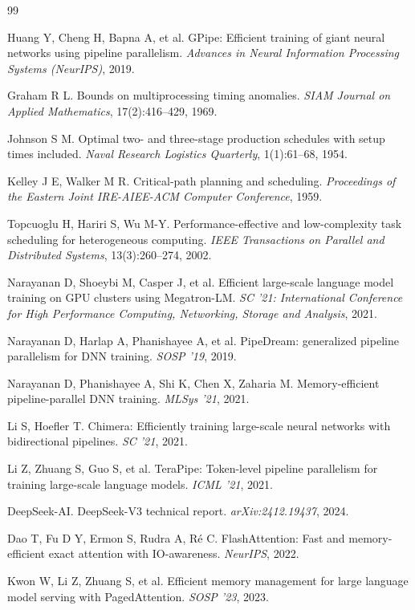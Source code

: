 \documentclass[11pt]{article}
\begin{document}
\begin{thebibliography}{99}

 Huang Y, Cheng H, Bapna A, et al. GPipe: Efficient training of giant neural networks using pipeline parallelism. \emph{Advances in Neural Information Processing Systems (NeurIPS)}, 2019.

 Graham R L. Bounds on multiprocessing timing anomalies. \emph{SIAM Journal on Applied Mathematics}, 17(2):416--429, 1969.

 Johnson S M. Optimal two- and three-stage production schedules with setup times included. \emph{Naval Research Logistics Quarterly}, 1(1):61--68, 1954.

 Kelley J E, Walker M R. Critical-path planning and scheduling. \emph{Proceedings of the Eastern Joint IRE-AIEE-ACM Computer Conference}, 1959.

 Topcuoglu H, Hariri S, Wu M-Y. Performance-effective and low-complexity task scheduling for heterogeneous computing. \emph{IEEE Transactions on Parallel and Distributed Systems}, 13(3):260--274, 2002.

 Narayanan D, Shoeybi M, Casper J, et al. Efficient large-scale language model training on GPU clusters using Megatron-LM. \emph{SC '21: International Conference for High Performance Computing, Networking, Storage and Analysis}, 2021.

 Narayanan D, Harlap A, Phanishayee A, et al. PipeDream: generalized pipeline parallelism for DNN training. \emph{SOSP '19}, 2019.

 Narayanan D, Phanishayee A, Shi K, Chen X, Zaharia M. Memory-efficient pipeline-parallel DNN training. \emph{MLSys '21}, 2021.

 Li S, Hoefler T. Chimera: Efficiently training large-scale neural networks with bidirectional pipelines. \emph{SC '21}, 2021.

 Li Z, Zhuang S, Guo S, et al. TeraPipe: Token-level pipeline parallelism for training large-scale language models. \emph{ICML '21}, 2021.

 DeepSeek-AI. DeepSeek-V3 technical report. \emph{arXiv:2412.19437}, 2024.

 Dao T, Fu D Y, Ermon S, Rudra A, R\'e C. FlashAttention: Fast and memory-efficient exact attention with IO-awareness. \emph{NeurIPS}, 2022.

 Kwon W, Li Z, Zhuang S, et al. Efficient memory management for large language model serving with PagedAttention. \emph{SOSP '23}, 2023.


\end{thebibliography}
\end{document}
